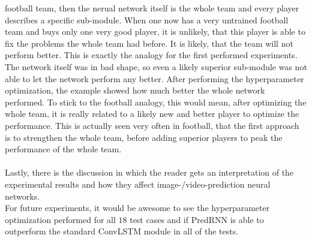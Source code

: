  football team, then the nerual network itself is the whole team and every player describes a specific sub-module. When one now has a very untrained football team
 and buys only one very good player, it is unlikely, that this player is able to fix the problems the whole team had before. It is likely, that the team will
 not perform better. This is exactly the analogy for the first performed experiments. The network itself was in bad shape, so even a likely superior
 sub-module was not able to let the network perform any better. After performing the hyperparameter optimization, the example showed how much better the
 whole network performed. To stick to the football analogy, this would mean, after optimizing the whole team, it is really related to a likely new and better 
 player to optimize the performance. This is actually seen very often in football, that the first approach is to strengthen the whole team, before adding superior
 players to peak the performance of the whole team. 
 \\\\
 Lastly, there is the discussion in which
 the reader gets an interpretation of the experimental results and how they affect image-/video-prediction neural networks.
 \\
 For future experiments, it would be awesome to see the hyperparameter optimization performed for all $18$ test cases and if PredRNN is able to outperform
 the standard ConvLSTM module in all of the tests.